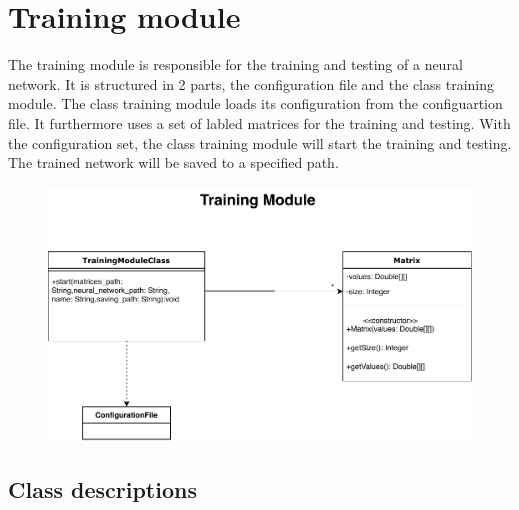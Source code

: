 \documentclass[parskip=full]{scrartcl}
\begin{document}
\section{Training module}
The training module is responsible for the training and testing of a \gls{neural network}.
It is structured in 2 parts, the configuration file and the class training module.
The class training module loads its configuration from the configuartion file.
It furthermore uses a set of labled matrices for the training and testing.
With the configuration set, the class training module will start the training and testing.
The trained network will be saved to a specified path.
%
\begin{figure}[h]
\begin{center}
\includegraphics{ClassDiagrams/PDF/TrainingModule_classdiagram.pdf}
\label{Activity Diagrams}
\end{center}
\end{figure}

\subsection{Class descriptions}
\end{document}
